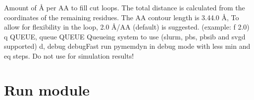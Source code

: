 \documentclass[letterpaper,10pt,english]{sphinxmanual}
\begin{document}
\begin{sphinxVerbatim}[commandchars=\\\{\}]
                        Amount of Å per AA to fill cut loops. The total
                        distance is calculated from the coordinates of the
                        remaining residues. The AA contour length is 3.4\PYGZhy{}4.0
                        Å, To allow for flexibility in the loop, 2.0 Å/AA
                        (default) is suggested. (example: \PYGZhy{}f 2.0)
  \PYGZhy{}q QUEUE, \PYGZhy{}\PYGZhy{}queue QUEUE
                        Queueing system to use (slurm, pbs, pbs\PYGZus{}ib and svgd
                        supported)
  \PYGZhy{}d, \PYGZhy{}\PYGZhy{}debug
  \PYGZhy{}\PYGZhy{}debugFast           run pymemdyn in debug mode with less min and eq steps.
                        Do not use for simulation results!
\end{sphinxVerbatim}

\sphinxstepscope


\section{Run module}
\label{\detokenize{run:module-run}}\label{\detokenize{run:run-module}}\label{\detokenize{run::doc}}
\end{document}
